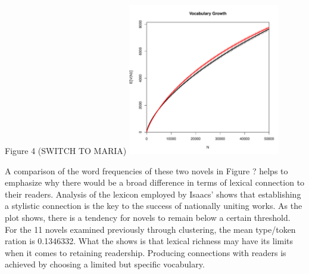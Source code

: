 \documentclass[12pt]{report}\usepackage[]{graphicx}\usepackage[]{color}
\newenvironment{knitrout}{}{} %
\begin{document}
\begin{spacing}{1.9}
Figure 4 (SWITCH TO MARIA)
\begin{knitrout}
\color{fgcolor}
\includegraphics[width=250,height=250]{figure/Vgc-1} 

\end{knitrout}


A comparison of the word frequencies of these two novels in Figure ? helps to emphasize why there would be a broad difference in terms of lexical connection to their readers.
Analysis of the lexicon employed by Isaacs' shows that establishing a stylistic connection is the key to the success of nationally uniting works. 
As the plot shows, there is a tendency for novels to remain below a certain threshold.
For the 11 novels examined previously through clustering, the mean type/token ration is 0.1346332.
What the shows is that lexical richness may have its limits when it comes to retaining readership. 
Producing connections with readers is achieved by choosing a limited but specific vocabulary.



\end{spacing}
\end{document}
